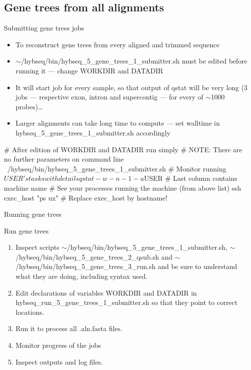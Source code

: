 \documentclass[compress,  xelatex, 11pt, xcolor=x11names, aspectratio=169,
	hyperref={
		bookmarks=true,
		unicode=true,
		colorlinks=true,
		pdftitle={HybSeq course},
		plainpages=false,
		pdfauthor={Vojtech Zeisek},
		pdfsubject={Practical processing of HybSeq target enrichment sequencing data on computing grids like MetaCentrum},
		pdfcreator={XeLaTeX},
		pdfkeywords={BASH, command line, GNU, HybSeq, Linux, MetaCentrum, sequencing shell, target enrichment},
		linkcolor=Turquoise4, %
		anchorcolor=DodgerBlue4, %
		citecolor=DodgerBlue4, %
		filecolor=DodgerBlue4, %
		menucolor=Tan4, %
		urlcolor=DarkOliveGreen4 %
		},
	url={hyphens, lowtilde} %
	]{beamer}
\renewcommand{\texttt}[1]{\colorbox{Cornsilk2}{{\ttfamily #1}}}
\renewcommand{\alert}[1]{\textcolor{OrangeRed3}{#1}}
\begin{document}
\subsection{Gene trees from all alignments}

\begin{frame}[fragile]{Submitting gene trees jobs}
	\begin{itemize}
		\item To reconstruct gene trees from every aligned and trimmed sequence
		\item \alert{\texttt{$\sim$/hybseq/bin/hybseq\_5\_gene\_trees\_1\_submitter.sh} must be edited before running it --- change \texttt{WORKDIR} and \texttt{DATADIR}}
		\item It will start job for every sample, so that output of \texttt{qstat} will be very long (3 jobs --- respective exon, intron and supercontig --- for every of $\sim$1000 probes)\ldots
		\item Larger alignments can take long time to compute --- set \texttt{walltime} in \texttt{hybseq\_5\_gene\_trees\_1\_submitter.sh} accordingly
	\end{itemize}
	\begin{bashcode}
    # After edition of WORKDIR and DATADIR run simply
    # NOTE: There are no further parameters on command line
    ~/hybseq/bin/hybseq_5_gene_trees_1_submitter.sh
    # Monitor running $USER's tasks with details
    qstat -w -n -1 -u $USER # Last column contains machine name
    # See your processes running the machine (from above list)
    ssh exec_host "ps ux" # Replace exec_host by hostname!
	\end{bashcode}
\end{frame}

\begin{frame}{Running gene trees}
	\begin{exampleblock}{Run gene trees}
		\begin{enumerate}
			\item Inspect scripts \texttt{$\sim$/hybseq/bin/hybseq\_5\_gene\_trees\_1\_submitter.sh}, \texttt{$\sim$/hybseq/bin/hybseq\_5\_gene\_trees\_2\_qsub.sh} and \texttt{$\sim$/hybseq/bin/hybseq\_5\_gene\_trees\_3\_run.sh} and be sure to understand what they are doing, including syntax used.
			\item Edit declarations of variables \texttt{WORKDIR} and \texttt{DATADIR} in \texttt{hybseq\_run\_5\_gene\_trees\_1\_submitter.sh} so that they point to correct locations.
			\item Run it to process all \texttt{*.aln.fasta} files.
			\item Monitor progress of the jobs
			\item Inspect outputs and log files.
		\end{enumerate}
	\end{exampleblock}
\end{frame}
\end{document}
